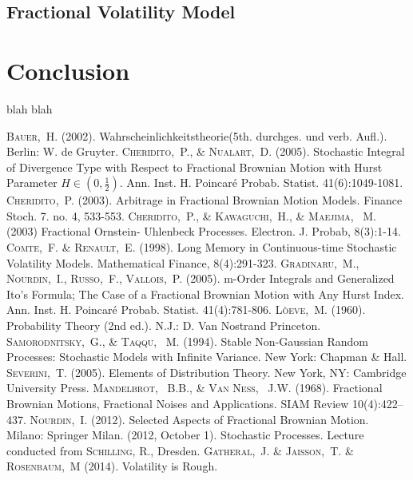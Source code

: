 \documentclass[a4paper, twoside, 11pt]{article}
\theoremstyle{definition}
\begin{document}
\subsection{Fractional Volatility Model}

\newpage



\section{Conclusion}

blah
\newpage
blah
\newpage

\fancyhead[LO, RE]{}
\begin{thebibliography}{99}
	 \textsc{Bauer,~H.} (2002). Wahrscheinlichkeitstheorie(5th. durchges. und verb. Aufl.). Berlin: W. de Gruyter.
	 \textsc{Cheridito,~P., \& Nualart,~D.} (2005). Stochastic Integral of Divergence Type with Respect to Fractional Brownian Motion with Hurst Parameter $H \in(0, \frac{1}{2})$. Ann. Inst. H. Poincar\'e Probab. Statist. 41(6):1049-1081. 
	 \textsc{Cheridito,~P.} (2003). Arbitrage in Fractional Brownian Motion Models. Finance Stoch. 7. no. 4, 533-553.
	 \textsc{Cheridito,~P., \& Kawaguchi,~H., \& Maejima, ~M.} (2003) Fractional Ornstein- Uhlenbeck Processes. Electron. J. Probab, 8(3):1-14.
	 \textsc{Comte,~F. \& Renault,~E.} (1998). Long Memory in Continuous-time Stochastic Volatility Models. Mathematical Finance, 8(4):291-323.
	 \textsc{Gradinaru,~M., Nourdin,~I., Russo,~F., Vallois,~P.} (2005). m-Order Integrals and Generalized Ito's Formula; The Case of a Fractional Brownian Motion with Any Hurst Index. Ann. Inst. H. Poincar\'e Probab. Statist. 41(4):781-806. 
	 \textsc{L\`oeve,~M.} (1960). Probability Theory (2nd ed.). N.J.: D. Van Nostrand Princeton.
	 \textsc{Samorodnitsky,~G., \& Taqqu, ~M.} (1994). Stable Non-Gaussian Random Processes: Stochastic Models with Infinite Variance. New York: Chapman \& Hall.
	\textsc{Severini,~T.} (2005). Elements of Distribution Theory. New York, NY: Cambridge University Press.
	 \textsc{Mandelbrot, ~B.B., \& Van Ness, ~J.W.} (1968). Fractional Brownian Motions, Fractional Noises and Applications. SIAM Review 10(4):422–437.
	 \textsc{Nourdin,~I.} (2012). Selected Aspects of Fractional Brownian Motion. Milano: Springer Milan.
	 (2012, October 1). Stochastic Processes. Lecture conducted from \textsc{Schilling, R.}, Dresden.
	 \textsc{Gatheral,~J. \& Jaisson,~T. \& Rosenbaum,~M} (2014). Volatility is Rough.
\end{thebibliography}
\newpage
\end{document}
